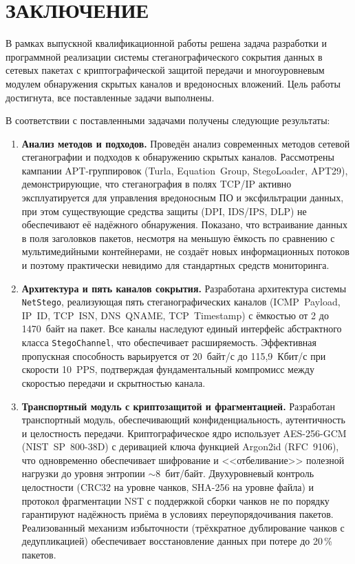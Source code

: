\section*{ЗАКЛЮЧЕНИЕ}

В рамках выпускной квалификационной работы решена задача разработки и программной реализации системы стеганографического сокрытия данных в сетевых пакетах с криптографической защитой передачи и многоуровневым модулем обнаружения скрытых каналов и вредоносных вложений. Цель работы достигнута, все поставленные задачи выполнены.

В соответствии с поставленными задачами получены следующие результаты:

\begin{enumerate}[label=\arabic*)]
    \item \textbf{Анализ методов и подходов.} Проведён анализ современных методов сетевой стеганографии и подходов к обнаружению скрытых каналов. Рассмотрены кампании APT-группировок (Turla, Equation~Group, StegoLoader, APT29), демонстрирующие, что стеганография в полях TCP/IP активно эксплуатируется для управления вредоносным ПО и эксфильтрации данных, при этом существующие средства защиты (DPI, IDS/IPS, DLP) не обеспечивают её надёжного обнаружения. Показано, что встраивание данных в поля заголовков пакетов, несмотря на меньшую ёмкость по сравнению с мультимедийными контейнерами, не создаёт новых информационных потоков и поэтому практически невидимо для стандартных средств мониторинга.

    \item \textbf{Архитектура и пять каналов сокрытия.} Разработана архитектура системы \texttt{NetStego}, реализующая пять стеганографических каналов (ICMP~Payload, IP~ID, TCP~ISN, DNS~QNAME, TCP~Timestamp) с ёмкостью от 2 до 1470~байт на пакет. Все каналы наследуют единый интерфейс абстрактного класса \texttt{StegoChannel}, что обеспечивает расширяемость. Эффективная пропускная способность варьируется от 20~байт/с до 115{,}9~Кбит/с при скорости 10~PPS, подтверждая фундаментальный компромисс между скоростью передачи и скрытностью канала.

    \item \textbf{Транспортный модуль с криптозащитой и фрагментацией.} Разработан транспортный модуль, обеспечивающий конфиденциальность, аутентичность и целостность передачи. Криптографическое ядро использует AES-256-GCM (NIST~SP~800-38D) с деривацией ключа функцией Argon2id (RFC~9106), что одновременно обеспечивает шифрование и <<отбеливание>> полезной нагрузки до уровня энтропии $\sim 8$~бит/байт. Двухуровневый контроль целостности (CRC32 на уровне чанков, SHA-256 на уровне файла) и протокол фрагментации NST с поддержкой сборки чанков не по порядку гарантируют надёжность приёма в условиях переупорядочивания пакетов. Реализованный механизм избыточности (трёхкратное дублирование чанков с дедупликацией) обеспечивает восстановление данных при потере до 20\,\% пакетов.


\end{enumerate}
